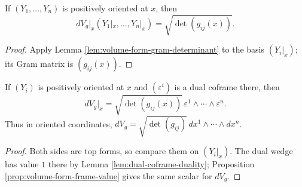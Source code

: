 \begin{proposition}
\label{prop:volume-form-frame-value}





If $(Y_1,\ldots,Y_n)$ is positively oriented at $x$, then
\[
dV_g|_x(Y_1|_x,\ldots,Y_n|_x)=\sqrt{\det(g_{ij}(x))}.
\]
\end{proposition}

\begin{proof}

\sketch Apply Lemma \ref{lem:volume-form-gram-determinant} to the basis $(Y_i|_x)$; its Gram matrix is $(g_{ij}(x))$.
\end{proof}

\begin{proposition}
\label{prop:volume-form-coordinate-formula}





If $(Y_i)$ is positively oriented at $x$ and $(\varepsilon^i)$ is a dual coframe there, then
\[
dV_g|_x=\sqrt{\det(g_{ij}(x))}\,\varepsilon^1\wedge\cdots\wedge\varepsilon^n.
\]
Thus in oriented coordinates, $dV_g=\sqrt{\det(g_{ij})}\,dx^1\wedge\cdots\wedge dx^n$.
\end{proposition}

\begin{proof}

\sketch Both sides are top forms, so compare them on $(Y_i|_x)$. The dual wedge has value $1$ there by Lemma \ref{lem:dual-coframe-duality}; Proposition \ref{prop:volume-form-frame-value} gives the same scalar for $dV_g$.
\end{proof}

